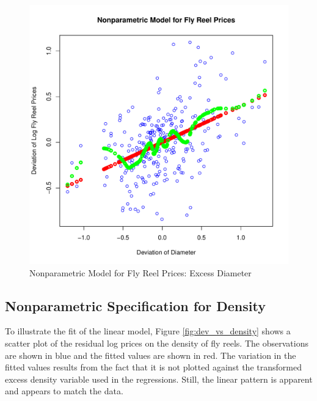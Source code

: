 \documentclass[11pt]{paper}
\begin{document}
\begin{figure}[h!]
  \centering
  \includegraphics[scale = 0.5, keepaspectratio=true]{../Figures/dev_np_vs_diameter_dev}
  \caption{Nonparametric Model for Fly Reel Prices: Excess Diameter} \label{fig:dev_np_vs_diameter_dev}
\end{figure}



\clearpage
\subsection{Nonparametric Specification for Density}

To illustrate the fit of the linear model, 
Figure \ref{fig:dev_vs_density} shows a scatter plot 
of the residual log prices on 
the density of fly reels. 
The observations are shown in blue
and the fitted values are shown in red.
The variation in the fitted values results from the 
fact that it is not plotted against the transformed 
excess density variable 
used in the regressions.
Still, the linear pattern is apparent
and appears to match the data. 
\end{document}
